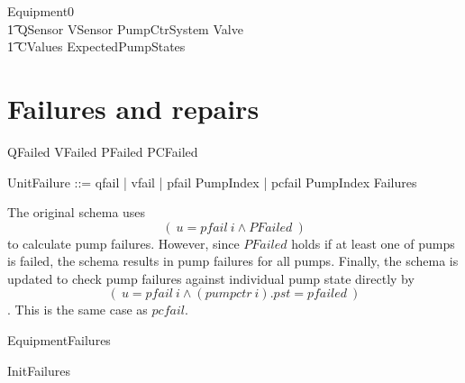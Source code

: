 \documentclass{report} %
\begin{document}
\begin{zed}
  Equipment0 
  \\ %
  \t1
    QSensor \land VSensor \land PumpCtrSystem \land Valve \land \\ %
  \t1  CValues \land ExpectedPumpStates
\end{zed}

\section{Failures and repairs}

\begin{zed}
  QFailed 
  \also %
  VFailed 
  \also %
  PFailed 
  \also %
  PCFailed 
\end{zed}

\begin{zed}
  UnitFailure ::= qfail | vfail | pfail \ldata PumpIndex \rdata | pcfail \ldata PumpIndex \rdata
  \also %
  Failures 
\end{zed}

The original schema uses \[(~ u = pfail~i \land PFailed ~) \] to calculate pump failures. However, since $PFailed$ holds if at least one of pumps is failed, the schema results in pump failures for all pumps. Finally, the schema is updated to check pump failures against individual pump state directly by \[(~ u = pfail~i \land (pumpctr~i).pst = pfailed ~) \]. This is the same case as $pcfail$.

\begin{zed}
EquipmentFailures 
\end{zed}

\begin{zed}
  InitFailures 
\end{zed}
\end{document}
